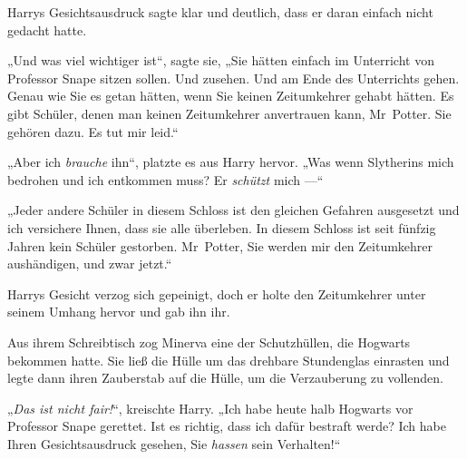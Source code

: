 Harrys Gesichtsausdruck sagte klar und deutlich, dass er daran einfach nicht gedacht hatte.

„Und was viel wichtiger ist“, sagte sie,
„Sie hätten einfach im Unterricht von Professor Snape sitzen sollen. Und zusehen. Und am Ende des Unterrichts gehen. Genau wie Sie es getan hätten, wenn Sie keinen Zeitumkehrer gehabt hätten. Es gibt Schüler, denen man keinen Zeitumkehrer anvertrauen kann, Mr~Potter. Sie gehören dazu. Es tut mir leid.“

„Aber ich \emph{brauche} ihn“, platzte es aus Harry hervor.
„Was wenn Slytherins mich bedrohen und ich entkommen muss? Er \emph{schützt} mich —“

„Jeder andere Schüler in diesem Schloss ist den gleichen Gefahren ausgesetzt und ich versichere Ihnen, dass sie alle überleben. In diesem Schloss ist seit fünfzig Jahren kein Schüler gestorben. Mr~Potter, Sie werden mir den Zeitumkehrer aushändigen, und zwar jetzt.“

Harrys Gesicht verzog sich gepeinigt, doch er holte den Zeitumkehrer unter seinem Umhang hervor und gab ihn ihr.

Aus ihrem Schreibtisch zog Minerva eine der Schutzhüllen, die Hogwarts bekommen hatte. Sie ließ die Hülle um das drehbare Stundenglas einrasten und legte dann ihren Zauberstab auf die Hülle, um die Verzauberung zu vollenden.

„\emph{Das ist nicht fair!}“, kreischte Harry.
„Ich habe heute halb Hogwarts vor Professor Snape gerettet. Ist es richtig, dass ich dafür bestraft werde? Ich habe Ihren Gesichtsausdruck gesehen, Sie \emph{hassen} sein Verhalten!“

